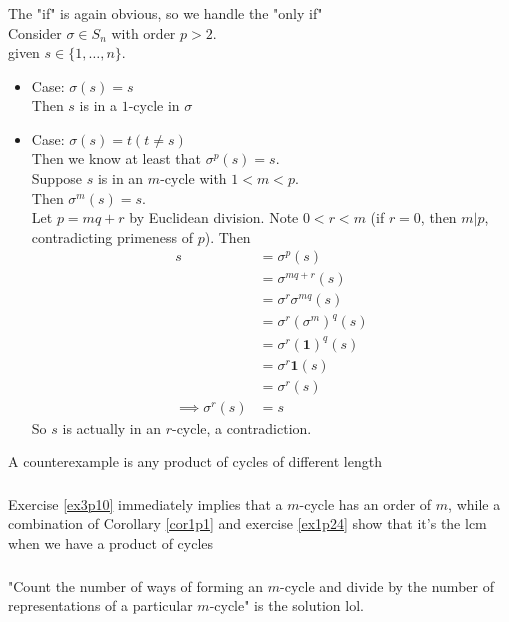 \documentclass{article}
\newcommand{\set}[1]{ \{ #1 \} }
\newcommand{\id}{ \bm{1} }
\begin{document}
\subsubsection{}\label{ex3p14}
The "if" is again obvious, so we handle the "only if"\\
Consider $\sigma \in S_n$ with order $p > 2$.\\
given $s \in \set{1,\ldots,n}$.\\
\begin{itemize}
\item Case: $\sigma(s) = s$\\
Then $s$ is in a $1$-cycle in $\sigma$
\item Case: $\sigma(s) = t (t \neq s)$\\
Then we know at least that $\sigma^p(s) = s$.\\
Suppose $s$ is in an $m$-cycle with $1 < m < p$.\\
Then $\sigma^m(s) = s$.\\
Let $p = mq  + r$ by Euclidean division. Note $0 < r < m$ (if $r=0$, then $m|p$, contradicting primeness of $p$). Then
\begin{align*}
s &= \sigma^{p}(s)\\
&= \sigma^{mq+r}(s)\\
&= \sigma^r\sigma^{mq}(s)\\
&= \sigma^r(\sigma^m)^q(s)\\
&= \sigma^r(\id)^q(s)\\
&= \sigma^r\id(s)\\
&= \sigma^r(s)\\
\implies \sigma^r(s) &= s
\end{align*}
So $s$ is actually in an $r$-cycle, a contradiction.
\end{itemize}
A counterexample is any product of cycles of different length
\subsubsection{}\label{ex3p15}
Exercise \ref{ex3p10} immediately implies that a $m$-cycle has an order of $m$, while a combination of Corollary \ref{cor1p1} and exercise \ref{ex1p24} show that it's the lcm when we have a product of cycles
\subsubsection{}\label{ex3p16}
"Count the number of ways of forming an $m$-cycle and divide by the number of representations of a particular $m$-cycle" is the solution lol.
\end{document}
